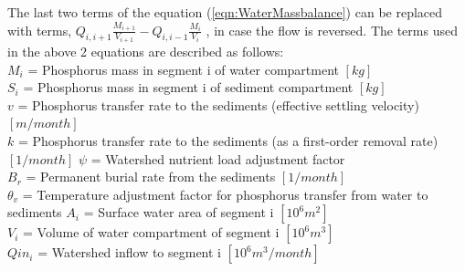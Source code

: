 \documentclass[fleqn]{article}
\begin{document}
The last two terms of the equation (\ref{eqn:WaterMassbalance}) can be replaced with terms, $Q_{i,i+1}\frac{M_{i+1}}{V_{i+1}}-Q_{i,i-1}\frac{M_i}{V_i}$ , in case the flow is reversed. The terms used in the above 2 equations are described as follows:\\
$M_i$ = Phosphorus mass in segment i of water compartment $[kg]$ \\
$S_i$ = Phosphorus mass in segment i of sediment compartment $[kg]$ \\
$v$ = Phosphorus transfer rate to the sediments (effective settling velocity) $[m/month]$\\
$k$ = Phosphorus transfer rate to the sediments (as a first-order removal rate)\\ $[1/month]$
$\psi$ = Watershed nutrient load adjustment factor\\
$B_r$ = Permanent burial rate from the sediments $[1/month]$\\
$\theta_v$ = Temperature adjustment factor for phosphorus transfer from water to sediments
$A_i$ = Surface water area of segment i $[10^6 m^2]$\\
$V_i$ = Volume of water compartment of segment i $[10^6 m^3]$ \\
$Qin_i$ = Watershed inflow to segment i $[10^6 m^3/month]$ \\


\newpage
\printbibliography
\end{document}
